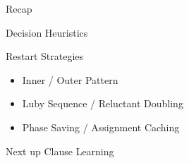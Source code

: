 \documentclass[t]{sdqbeamer}
\begin{document}
\begin{frame}{Recap}
	\begin{block}{Decision Heuristics}
	\end{block}
	\begin{block}{Restart Strategies}
		\begin{itemize}\setlength{\itemsep}{1ex}
			\item Inner / Outer Pattern
			\item Luby Sequence / Reluctant Doubling
			\item Phase Saving / Assignment Caching
		\end{itemize}
	\end{block}
	\begin{block}{Next up}
		Clause Learning
	\end{block}
\end{frame}
\end{document}
